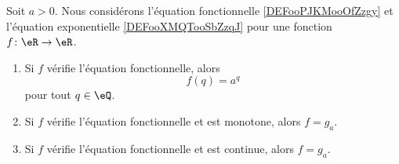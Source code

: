 \begin{proposition}    \label{PROPooGBUPooWtWaFI}
	Soit \( a>0\). Nous considérons l'équation fonctionnelle \ref{DEFooPJKMooOfZzgy} et l'équation exponentielle \ref{DEFooXMQTooSbZzqJ} pour une fonction \( f\colon \eR\to \eR\).
	\begin{enumerate}
		\item       \label{ITEMooYHAVooWzJqBj}
		      Si \( f\) vérifie l'équation fonctionnelle, alors
		      \begin{equation}
			      f(q)=a^q
		      \end{equation}
		      pour tout \( q\in \eQ\).
		\item       \label{ITEMooQHOMooNVzSxn}
		      Si \( f\) vérifie l'équation fonctionnelle et est monotone, alors \( f=g_a\).
		\item       \label{ITEMooCNXOooZcrxeB}
		      Si \( f\) vérifie l'équation fonctionnelle et est continue, alors \( f=g_a\).
	\end{enumerate}
\end{proposition}


